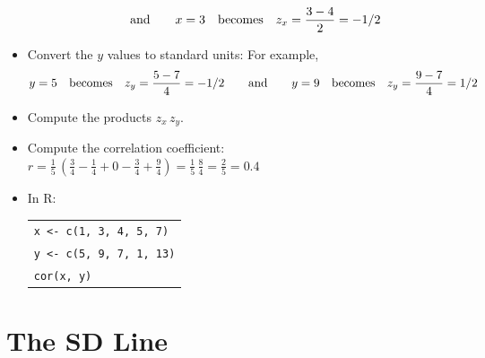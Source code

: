 \documentclass[t]{beamer}
\begin{document}
\begin{frame}
\begin{itemize}
\[\mbox{\hspace{20pt}and\hspace{20pt}}
x = 3\mbox{\hspace{10pt}becomes\hspace{10pt}} z_x = \frac{3-4}{2} = -1/2\]
\item<4-> Convert the $y$ values to standard units:
For example,\vspace{-3pt}
\[y=5\mbox{\hspace{10pt}becomes\hspace{10pt}} z_y=\frac{5-7}{4} = -1/2
\mbox{\hspace{20pt}and\hspace{20pt}}
y=9\mbox{\hspace{10pt}becomes\hspace{10pt}}  z_y = \frac{9-7}{4} = 1/2\vspace{-5pt}\]
\item<5-> Compute the products $z_x\,z_y$.
\item<6-> Compute the correlation coefficient:
{\color{blue}$r = \frac{1}{5}\,\left(\frac{3}{4} - \frac{1}{4} + 0 - \frac{3}{4} + \frac{9}{4}\right)
  = \frac{1}{5}\,\frac{8}{4} = \frac{2}{5} = 0.4$}
\item<7-> In R:\begin{tabular}{l}
\texttt{x <- c(1, 3, 4, 5, 7)}\\
\texttt{y <- c(5, 9, 7, 1, 13)}\\
\texttt{cor(x, y)}
\end{tabular}
\end{itemize}

\end{frame}

\section{The SD Line}
\end{document}
